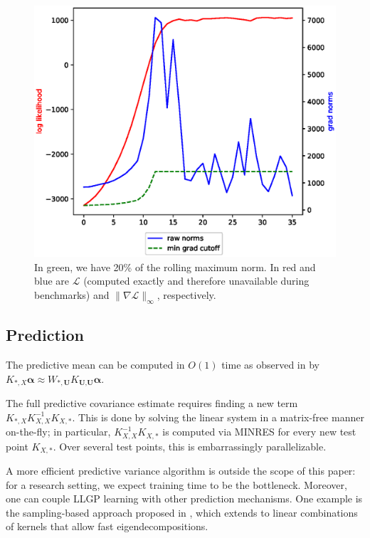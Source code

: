 \documentclass{article}
\def\bsa{{\boldsymbol\alpha}}
\def \mcL {\mathcal{L}}
\def\TU{\textbf{U}}
\newcommand{\norm}[1]{\mathopen\| #1 \mathclose\|}%
\begin{document}
\begin{figure}[!ht]
\vskip 0.1in
\begin{center}
\centerline{\includegraphics[width=\columnwidth]{running_cutoff.eps}}
\caption{In green, we have 20\% of the rolling maximum norm. In red and blue are $\mcL$ (computed exactly and therefore unavailable during benchmarks) and $ \norm{\nabla\mcL}_\infty $, respectively. }
\label{fx2007-stop}
\end{center}
\vskip -0.1in
\end{figure}

\subsection{Prediction}

The predictive mean can be computed in $O(1)$ time as observed in \cite{msgp} by $K_{*,X}\bsa\approx W_{*,\TU}K_{\TU,\TU}\bsa$.

The full predictive covariance estimate requires finding a new term $K_{*,X}K_{X,X}^{-1}K_{X,*}$. This is done by solving the linear system in a matrix-free manner on-the-fly; in particular, $K_{X,X}^{-1}K_{X,*}$ is computed via MINRES for every new test point $K_{X,*}$. Over several test points, this is embarrassingly parallelizable.

A more efficient predictive variance algorithm is outside the scope of this paper: for a research setting, we expect training time to be the bottleneck. Moreover, one can couple LLGP learning with other prediction mechanisms. One example is the sampling-based approach proposed in \cite{papandreou2011efficient}, which extends to linear combinations of kernels that allow fast eigendecompositions.
\end{document}
